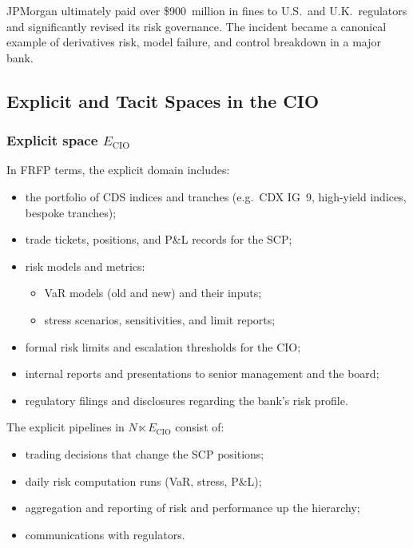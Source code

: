 JPMorgan ultimately paid over \$900~million in fines to U.S.\ and U.K.\
regulators and significantly revised its risk governance.
The incident became a canonical example of derivatives risk, model failure,
and control breakdown in a major bank.

\subsection{Explicit and Tacit Spaces in the CIO}

\subsubsection*{Explicit space \(E_{\mathrm{CIO}}\)}

In FRFP terms, the explicit domain includes:

\begin{itemize}
  \item the portfolio of CDS indices and tranches
        (e.g.\ CDX IG~9, high-yield indices, bespoke tranches);
  \item trade tickets, positions, and P\&L records for the SCP;
  \item risk models and metrics:
        \begin{itemize}
          \item VaR models (old and new) and their inputs;
          \item stress scenarios, sensitivities, and limit reports;
        \end{itemize}
  \item formal risk limits and escalation thresholds for the CIO;
  \item internal reports and presentations to senior management and the
        board;
  \item regulatory filings and disclosures regarding the bank’s risk profile.
\end{itemize}

The explicit pipelines in \(N \ltimes E_{\mathrm{CIO}}\) consist of:

\begin{itemize}
  \item trading decisions that change the SCP positions;
  \item daily risk computation runs (VaR, stress, P\&L);
  \item aggregation and reporting of risk and performance up the hierarchy;
  \item communications with regulators.
\end{itemize}

